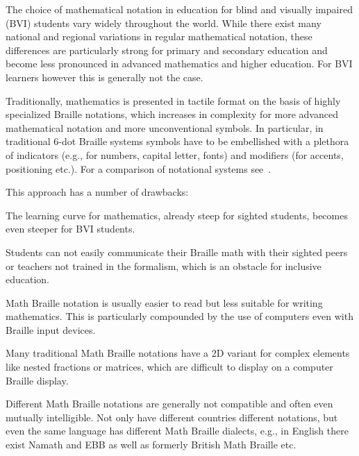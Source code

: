 \documentclass{article}
\begin{document}
The choice of mathematical notation in education for blind and visually impaired
(BVI) students vary widely throughout the world. While there exist many national
and regional variations in regular mathematical notation, these differences are
particularly strong for primary and secondary education and become less
pronounced in advanced mathematics and higher education. For BVI learners
however this is generally not the case.

Traditionally, mathematics is presented in tactile format on the basis of highly
specialized Braille notations, which increases in complexity for more advanced
mathematical notation and more unconventional symbols. In particular, in
traditional 6-dot Braille systems symbols have to be embellished with a plethora
of indicators (e.g., for numbers, capital letter, fonts) and modifiers (for
accents, positioning etc.). For a comparison of notational systems
see~\cite{van2022towards}.

This approach has a number of drawbacks: 
\begin{inparaenum}[(1)]
\item The learning curve for mathematics, already steep for sighted students,
  becomes even steeper for BVI students.
\item Students can not easily communicate their Braille math with their sighted
  peers or teachers not trained in the formalism, which is an obstacle for
  inclusive education.
\item Math Braille notation is usually easier to read but less suitable for
  writing mathematics. This is particularly compounded by the use of computers
  even with Braille input devices.
\item Many traditional Math Braille notations have a 2D variant for complex
  elements like nested fractions or matrices, which are difficult to display on
  a computer Braille display.
\item Different Math Braille notations are generally not compatible and often
  even mutually intelligible. Not only have different countries different
  notations, but even the same language has different Math Braille dialects,
  e.g., in English there exist Namath and EBB as well as formerly British Math
  Braille etc.
\end{inparaenum}
\end{document}
